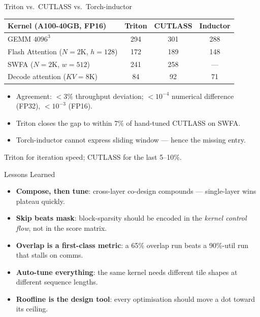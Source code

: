 \documentclass[10pt,aspectratio=169]{beamer}
\begin{document}
\begin{frame}{Triton vs.\ CUTLASS vs.\ Torch-inductor}
  \footnotesize
  \begin{tabular}{@{}lccc@{}}
    \toprule
    \textbf{Kernel (A100-40GB, FP16)} & \textbf{Triton} & \textbf{CUTLASS} & \textbf{Inductor}\\
    \midrule
    GEMM $4096^3$                  & 294 & 301 & 288\\
    Flash Attention ($N{=}2$K, $h{=}128$) & 172 & 189 & 148\\
    SWFA ($N{=}2$K, $w{=}512$)     & \alert{241} & \alert{258} & —\\
    Decode attention ($KV{=}8$K)   & 84  & 92  & 71\\
    \bottomrule
  \end{tabular}
  \vspace{2ex}

  \begin{itemize}\footnotesize
    \item Agreement: $<3\%$ throughput deviation; $<10^{-4}$
          numerical difference (FP32), $<10^{-3}$ (FP16).
    \item Triton closes the gap to within $7\%$ of hand-tuned CUTLASS
          on SWFA.
    \item Torch-inductor cannot express sliding window — hence the
          missing entry.
  \end{itemize}
  \centering\alert{Triton for iteration speed; CUTLASS for the last 5--10\%.}
\end{frame}


\begin{frame}{Lessons Learned}
  \begin{itemize}
    \item \textbf{Compose, then tune}: cross-layer co-design compounds
          — single-layer wins plateau quickly.
    \item \textbf{Skip beats mask}: block-sparsity should be encoded
          in the \emph{kernel control flow}, not in the score matrix.
    \item \textbf{Overlap is a first-class metric}: a 65\% overlap run
          beats a 90\%-util run that stalls on comms.
    \item \textbf{Auto-tune everything}: the same kernel needs
          different tile shapes at different sequence lengths.
    \item \textbf{Roofline is the design tool}: every optimisation
          should move a dot toward its ceiling.
  \end{itemize}
\end{frame}
\end{document}
